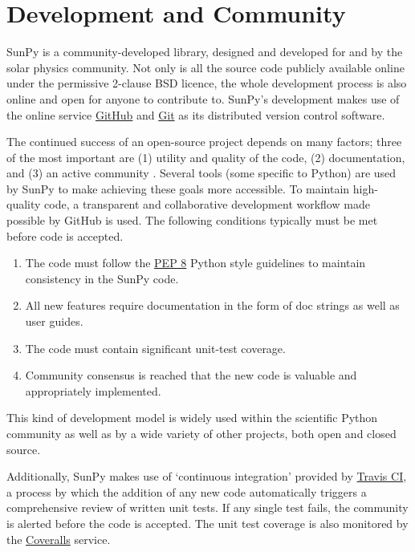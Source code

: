\section{Development and Community}\label{sec:dev}
SunPy is a community-developed library, designed and developed for and by 
the solar physics community. Not only is all the source code publicly available 
online under the permissive 2-clause BSD licence, the whole 
development process is also online and open for anyone to contribute to.
SunPy's development makes use of the online service 
\href{http://github.com}{GitHub} and \href{http://git-scm.com/}{Git}
as its distributed version control software. 

The continued success of an open-source project depends on many factors;
three of the most important are (1) utility and quality of the code, (2) documentation, and (3) an
active community \citep{bangerth2013}. Several tools (some specific to Python) are used by
SunPy to make achieving these goals more accessible. To maintain high-quality code, a 
transparent and collaborative development workflow made possible by GitHub is used.
The following conditions typically must be met before code is accepted.
\begin{enumerate}
	\item  The code must follow the
	\href{http://www.python.org/dev/peps/pep-0008/}{PEP 8} Python style 
	guidelines to maintain consistency in the SunPy code.
	
	\item All new features require documentation in the form of doc strings as well as user
	guides. 
	
	\item The code must contain significant unit-test coverage.

        \item Community consensus is reached that the new code is valuable and appropriately implemented.
\end{enumerate}
This kind of development model is widely used within the scientific Python 
community as well as by a wide variety of other projects, both open and closed 
source.

Additionally, SunPy makes use of `continuous integration' provided by
\href{http://travis-ci.org}{Travis CI}, a process by which the addition of any new code 
automatically triggers a comprehensive review of written unit tests. If any single test
fails, the community is alerted before the code is accepted. The unit test coverage is
also monitored by the \href{http://coveralls.io}{Coveralls} service.

